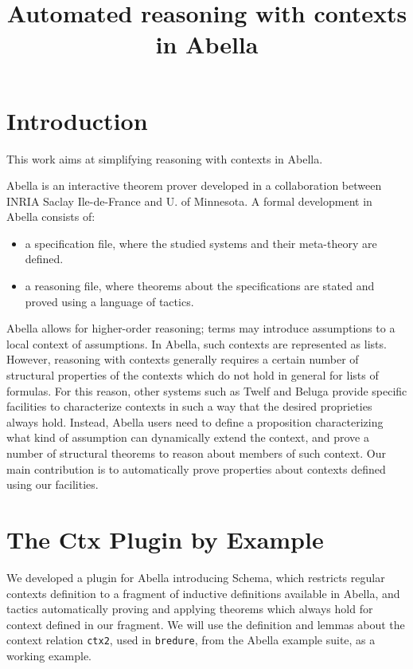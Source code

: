 \documentclass[nocopyrightspace,authoryear]{sigplanconf}
\title{Automated reasoning with contexts in Abella}
\begin{document}
\maketitle
\section{Introduction}
This work aims at simplifying reasoning with contexts in Abella.

Abella \cite{abellasys} is an interactive theorem prover developed in a collaboration between INRIA Saclay Ile-de-France and U. of Minnesota. A formal development in Abella consists of:
\begin{itemize}
\item a specification file, where the studied systems and their meta-theory are defined.
\item a reasoning file, where theorems about the specifications are stated and proved using a language of tactics.
\end{itemize}

Abella allows for higher-order reasoning; terms may introduce assumptions to a local context of assumptions. In Abella, such contexts are represented as lists. However, reasoning with contexts generally requires a certain number of structural properties of the contexts which do not hold in general for lists of formulas. For this reason, other systems such as Twelf \cite{twelfsys} and Beluga \cite{belugasys} provide specific facilities to characterize contexts in such a way that the desired proprieties always hold. Instead, Abella users need to define a proposition characterizing what kind of assumption can dynamically extend the context, and prove a number of structural theorems to reason about members of such context. Our main contribution is to automatically prove properties about contexts defined using our facilities.

\section{The Ctx Plugin by Example}

We developed a plugin for Abella introducing Schema, which restricts regular contexts definition to a fragment of inductive definitions available in Abella, and tactics automatically proving and applying theorems which always hold for context defined in our fragment. We will use the definition and lemmas about the context relation \lstinline|ctx2|, used in \lstinline|bredure|, from the Abella example suite, as a working example.
\end{document}
